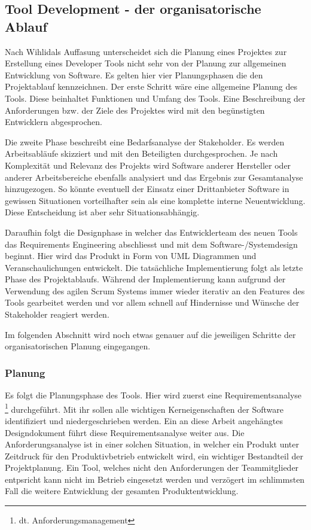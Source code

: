 \documentclass[pagesize, paper=a4, fontsize=12pt, titlepage=true, headings=small, headnosepline, abstractoff, liststotoc, nochapterprefix, plainheadsepline, twoside]{scrreprt}
\begin{document}
\subsection{Tool Development - der organisatorische Ablauf}
Nach Wihlidals Auffasung \parencite{Wihlidal2006} unterscheidet sich die Planung eines Projektes zur Erstellung eines Developer Tools nicht sehr von der Planung zur allgemeinen Entwicklung von Software. Es gelten hier vier Planungsphasen die den Projektablauf kennzeichnen. Der erste Schritt wäre eine allgemeine Planung des Tools. Diese beinhaltet Funktionen und Umfang des Tools. Eine Beschreibung der Anforderungen bzw. der Ziele des Projektes wird mit den begünstigten Entwicklern abgesprochen.

Die zweite Phase beschreibt eine Bedarfsanalyse der Stakeholder. Es werden Arbeitsabläufe skizziert und mit den Beteiligten durchgesprochen. Je nach Komplexität und Relevanz des Projekts wird Software anderer Hersteller oder anderer Arbeitsbereiche ebenfalls analysiert und das Ergebnis zur Gesamtanalyse hinzugezogen. So könnte eventuell der Einsatz einer Drittanbieter Software in gewissen Situationen vorteilhafter sein als eine komplette interne Neuentwicklung. Diese Entscheidung ist aber sehr Situationsabhängig.

Daraufhin folgt die Designphase in welcher das Entwicklerteam des neuen Tools das Requirements Engineering abschliesst und mit dem Software-/Systemdesign beginnt. Hier wird das Produkt in Form von UML Diagrammen und Veranschaulichungen entwickelt. Die tatsächliche Implementierung folgt als letzte Phase des Projektablaufs. Während der Implementierung kann aufgrund der Verwendung des agilen Scrum Systems immer wieder iterativ an den Features des Tools gearbeitet werden und vor allem schnell auf Hindernisse und Wünsche der Stakeholder reagiert werden.

Im folgenden Abschnitt wird noch etwas genauer auf die jeweiligen Schritte der organisatorischen Planung eingegangen.

\subsubsection{Planung}
Es folgt die Planungsphase des Tools. Hier wird zuerst eine Requirementsanalyse \footnote{dt. Anforderungsmanagement} durchgeführt. Mit ihr sollen alle wichtigen Kerneigenschaften der Software identifiziert und niedergeschrieben werden. Ein an diese Arbeit angehängtes Designdokument führt diese Requirementsanalyse weiter aus. Die Anforderungsanalyse ist in einer solchen Situation, in welcher ein Produkt unter Zeitdruck für den Produktivbetrieb entwickelt wird, ein wichtiger Bestandteil der Projektplanung. Ein Tool, welches nicht den Anforderungen der Teammitglieder entpsricht kann nicht im Betrieb eingesetzt werden und verzögert im schlimmsten Fall die weitere Entwicklung der gesamten Produktentwicklung.
\end{document}
